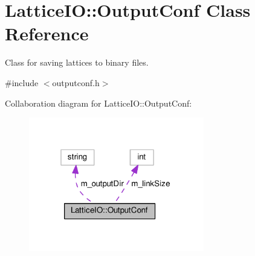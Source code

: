 \hypertarget{classLatticeIO_1_1OutputConf}{}\section{Lattice\+IO\+:\+:Output\+Conf Class Reference}
\label{classLatticeIO_1_1OutputConf}


Class for saving lattices to binary files.  




{\ttfamily \#include $<$outputconf.\+h$>$}



Collaboration diagram for Lattice\+IO\+:\+:Output\+Conf\+:\nopagebreak
\begin{figure}[H]
\begin{center}
\leavevmode
\includegraphics[width=217pt]{dd/d13/classLatticeIO_1_1OutputConf__coll__graph}
\end{center}
\end{figure}
